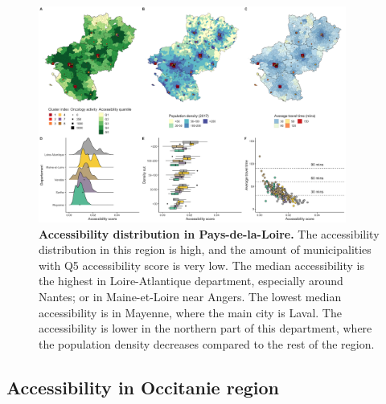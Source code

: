 \begin{figure}[H]
    \includegraphics[width=0.9\textwidth]{images/camion/region_accessibility/accessibility_Pays-de-la-Loire.png}
    \centering
    \caption{
        \textbf{Accessibility distribution in Pays-de-la-Loire.} The accessibility distribution
        in this region is high, and the amount of municipalities with Q5 accessibility
        score is very low. The median accessibility is the highest in Loire-Atlantique
        department, especially around Nantes; or in Maine-et-Loire near Angers. The
        lowest median accessibility is in Mayenne, where the main city is Laval. The
        accessibility is lower in the northern part of this department, where the
        population density decreases compared to the rest of the region.
    }
\end{figure}

\subsection*{Accessibility in Occitanie region}

